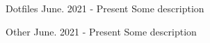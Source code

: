 
\begin{cventries}
  \vspace{-2mm}
  \cventry
    {Dotfiles}
    {}
    {}
    {June. 2021 - Present}
    {
      Some description
      \vspace{4mm}
    }

  \cventry
    {Other}
    {}
    {}
    {June. 2021 - Present}
    {
      Some description
      \vspace{4mm}
    }

\end{cventries}
